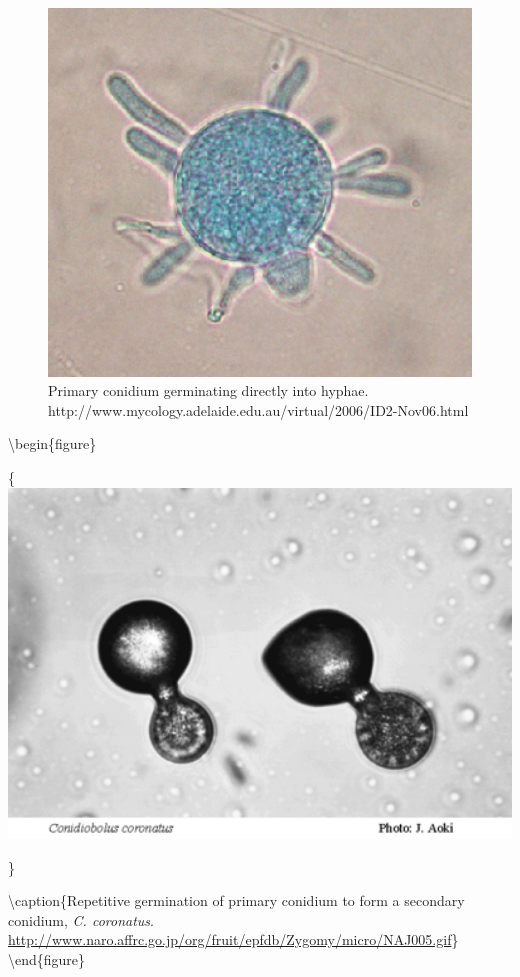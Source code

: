 \documentclass[]{book}
\begin{document}
\begin{figure}

{\centering \includegraphics[width=4.69in]{img/Ch5_Fig3} 

}

\caption{Primary conidium germinating directly into hyphae. http://www.mycology.adelaide.edu.au/virtual/2006/ID2-Nov06.html}\label{fig:ch5fig3}
\end{figure}

\textbackslash begin\{figure\}

\{\centering \includegraphics[width=5.33in]{img/Ch5_Fig4}

\}

\textbackslash caption\{Repetitive germination of primary conidium to form a secondary conidium, \emph{C. coronatus}. \url{http://www.naro.affrc.go.jp/org/fruit/epfdb/Zygomy/micro/NAJ005.gif}\}\label{fig:ch5fig4}
\textbackslash end\{figure\}
\end{document}
